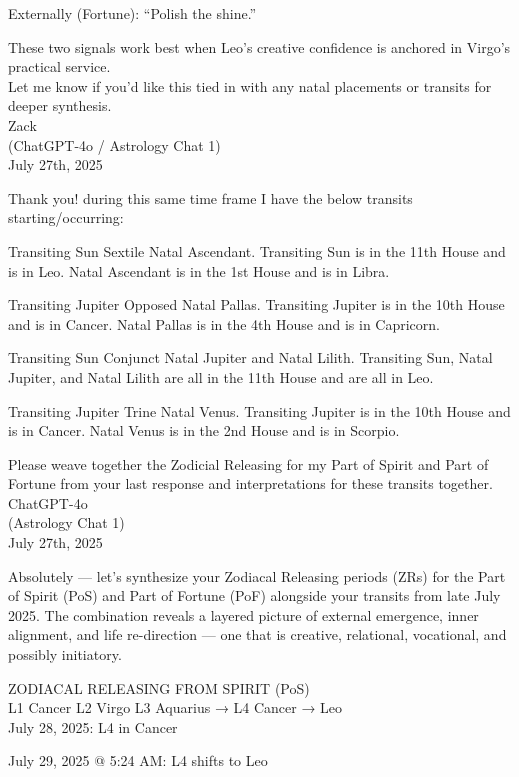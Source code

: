 \documentclass{article}
\begin{document}
Externally (Fortune): ``Polish the shine.''

These two signals work best when Leo's creative confidence is anchored
in Virgo's practical service.\\
Let me know if you'd like this tied in with any natal placements or
transits for deeper synthesis.\\
Zack\\
(ChatGPT-4o / Astrology Chat 1)\\
July 27th, 2025

Thank you! during this same time frame I have the below transits
starting/occurring:

Transiting Sun Sextile Natal Ascendant. Transiting Sun is in the 11th
House and is in Leo. Natal Ascendant is in the 1st House and is in
Libra.

Transiting Jupiter Opposed Natal Pallas. Transiting Jupiter is in the
10th House and is in Cancer. Natal Pallas is in the 4th House and is in
Capricorn.

Transiting Sun Conjunct Natal Jupiter and Natal Lilith. Transiting Sun,
Natal Jupiter, and Natal Lilith are all in the 11th House and are all in
Leo.

Transiting Jupiter Trine Natal Venus. Transiting Jupiter is in the 10th
House and is in Cancer. Natal Venus is in the 2nd House and is in
Scorpio.

Please weave together the Zodicial Releasing for my Part of Spirit and
Part of Fortune from your last response and interpretations for these
transits together.\\
ChatGPT-4o\\
(Astrology Chat 1)\\
July 27th, 2025

Absolutely --- let's synthesize your Zodiacal Releasing periods (ZRs)
for the Part of Spirit (PoS) and Part of Fortune (PoF) alongside your
transits from late July 2025. The combination reveals a layered picture
of external emergence, inner alignment, and life re-direction --- one
that is creative, relational, vocational, and possibly initiatory.

 ZODIACAL RELEASING FROM SPIRIT (PoS)\\
L1 Cancer \textbar{} L2 Virgo \textbar{} L3 Aquarius → L4 Cancer → Leo\\
July 28, 2025: L4 in Cancer

July 29, 2025 @ 5:24 AM: L4 shifts to Leo
\end{document}
